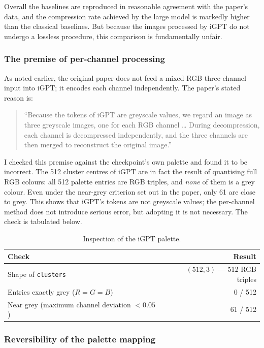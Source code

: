\documentclass[12pt,a4paper]{article}
\begin{document}
Overall the baselines are reproduced in reasonable agreement with the paper's data, and the
compression rate achieved by the large model is markedly higher than the classical baselines.
But because the images processed by iGPT do not undergo a lossless procedure, this comparison
is fundamentally unfair.

\subsubsection{The premise of per-channel processing}

As noted earlier, the original paper does not feed a mixed RGB three-channel input into iGPT;
it encodes each channel independently. The paper's stated reason is:

\begin{quote}
``Because the tokens of iGPT are greyscale values, we regard an image as three greyscale
images, one for each RGB channel \ldots{} During decompression, each channel is decompressed
independently, and the three channels are then merged to reconstruct the original image.''
\end{quote}

I checked this premise against the checkpoint's own palette and found it to be incorrect. The
512 cluster centres of iGPT are in fact the result of quantising full RGB colours: all 512
palette entries are RGB triples, and \emph{none} of them is a grey colour. Even under the
near-grey criterion set out in the paper, only 61 are close to grey. This shows that iGPT's
tokens are not greyscale values; the per-channel method does not introduce serious error, but
adopting it is not necessary. The check is tabulated below.

\begin{table}[htbp]\centering\small
\caption{Inspection of the iGPT palette.}
\begin{tabular}{@{}lr@{}}
\toprule
Check & Result \\
\midrule
Shape of \texttt{clusters} & $(512, 3)$ --- 512 RGB triples \\
Entries exactly grey ($R=G=B$) & 0 / 512 \\
Near grey (maximum channel deviation $<0.05$) & 61 / 512 \\
\bottomrule
\end{tabular}
\end{table}

\subsubsection{Reversibility of the palette mapping}
\end{document}
